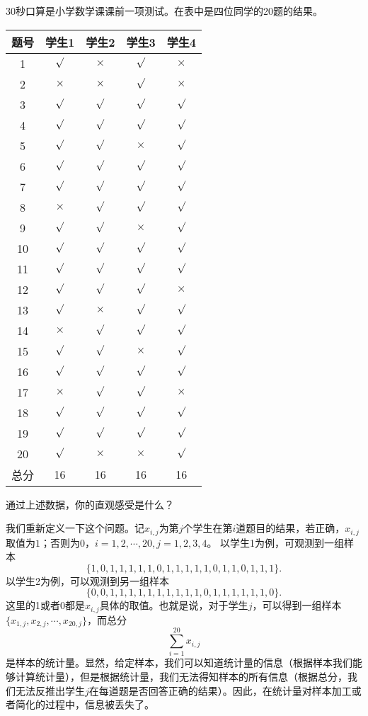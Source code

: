 \begin{example}
	30秒口算是小学数学课课前一项测试。在表中是四位同学的20题的结果。
	
	\begin{table}[h]
		\centering 
		\begin{tabular}{ c cccc}
			\hline
			题号 & 学生1 & 学生2 & 学生3 & 学生4\\ 
			\hline
			1 & $\surd$ & $\times$ & $\surd$ & $\times$ \\
			2 & $\times$ & $\times$ & $\surd$ & $\times$ \\
			3 & $\surd$ & $\surd$ & $\surd$ & $\surd$ \\
			4 & $\surd$ & $\surd$ & $\surd$ & $\surd$ \\
			5 & $\surd$ & $\surd$ & $\times$ & $\surd$ \\
			6 & $\surd$ & $\surd$ & $\surd$ & $\surd$ \\
			7 & $\surd$ & $\surd$ & $\surd$ & $\surd$ \\
			8 & $\times$ & $\surd$ & $\surd$ & $\surd$ \\
			9 & $\surd$ & $\surd$ & $\times$ & $\surd$ \\
			10 & $\surd$ & $\surd$ & $\surd$ & $\surd$ \\
			11 & $\surd$ & $\surd$ & $\surd$ & $\surd$ \\
			12 & $\surd$ & $\surd$ & $\surd$ & $\times$ \\
			13 & $\surd$ & $\times$ & $\surd$ & $\surd$ \\
			14 & $\times$ & $\surd$ & $\surd$ & $\surd$ \\
			15 & $\surd$ & $\surd$ & $\times$ & $\surd$ \\
			16 & $\surd$ & $\surd$ & $\surd$ & $\surd$ \\
			17 & $\times$ & $\surd$ & $\surd$ & $\times$ \\
			18 & $\surd$ & $\surd$ & $\surd$ & $\surd$ \\
			19 & $\surd$ & $\surd$ & $\surd$ & $\surd$ \\
			20 & $\surd$ & $\times$ & $\times$ & $\surd$ \\
			\hline
			总分 & 16 & 16 & 16 & 16 \\
			\hline
		\end{tabular}
	\end{table}
 通过上述数据，你的直观感受是什么？
 
我们重新定义一下这个问题。记$x_{i,j}$为第$j$个学生在第$i$道题目的结果，若正确，$x_{i,j}$取值为$1$；否则为$0$，$i=1,2,\cdots,20,j=1,2,3,4$。
    以学生1为例，可观测到一组样本
        $$\{1,0,1,1,1,
             1,1,0,1,1,
             1,1,1,0,1,
             1,0,1,1,1\}.$$
    以学生2为例，可以观测到另一组样本
     $$\{0,0,1,1,1,
         1,1,1,1,1,
          1,1,0,1,1,
           1,1,1,1,0\}.$$
      这里的1或者0都是$x_{i,j}$具体的取值。也就是说，对于学生$j$，可以得到一组样本
      $\{x_{1,j},x_{2,j},\cdots,x_{20,j}\}$，而总分
      $$
      \sum_{i=1}^{20} x_{i,j}
      $$
      是样本的统计量。显然，给定样本，我们可以知道统计量的信息（根据样本我们能够计算统计量），但是根据统计量，我们无法得知样本的所有信息（根据总分，我们无法反推出学生$j$在每道题是否回答正确的结果）。因此，在统计量对样本加工或者简化的过程中，信息被丢失了。
      \end{example}

